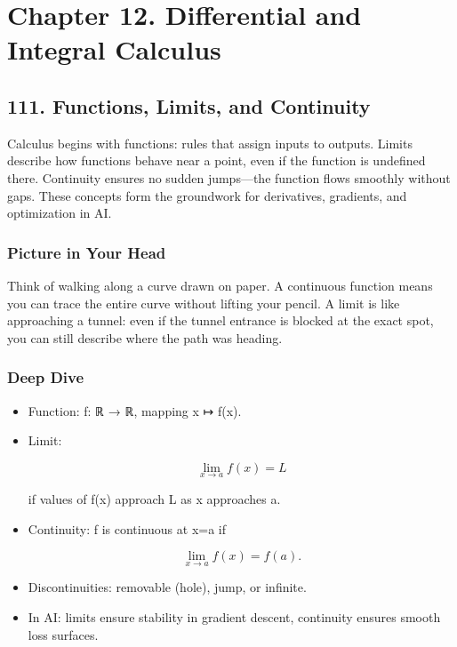 \documentclass[
  letterpaper,
  DIV=11,
  numbers=noendperiod]{scrreprt}
\begin{document}
\section{Chapter 12. Differential and Integral
Calculus}\label{chapter-12.-differential-and-integral-calculus}

\subsection{111. Functions, Limits, and
Continuity}\label{functions-limits-and-continuity}

Calculus begins with functions: rules that assign inputs to outputs.
Limits describe how functions behave near a point, even if the function
is undefined there. Continuity ensures no sudden jumps---the function
flows smoothly without gaps. These concepts form the groundwork for
derivatives, gradients, and optimization in AI.

\subsubsection{Picture in Your Head}\label{picture-in-your-head-110}

Think of walking along a curve drawn on paper. A continuous function
means you can trace the entire curve without lifting your pencil. A
limit is like approaching a tunnel: even if the tunnel entrance is
blocked at the exact spot, you can still describe where the path was
heading.

\subsubsection{Deep Dive}\label{deep-dive-110}

\begin{itemize}
\item
  Function: f: ℝ → ℝ, mapping x ↦ f(x).
\item
  Limit:

  \[
  \lim_{x \to a} f(x) = L
  \]

  if values of f(x) approach L as x approaches a.
\item
  Continuity: f is continuous at x=a if

  \[
  \lim_{x \to a} f(x) = f(a).
  \]
\item
  Discontinuities: removable (hole), jump, or infinite.
\item
  In AI: limits ensure stability in gradient descent, continuity ensures
  smooth loss surfaces.
\end{itemize}
\end{document}
